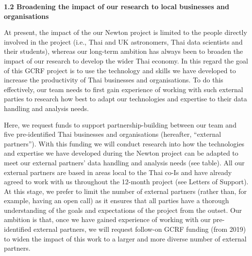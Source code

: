 \documentclass[11pt]{article}
\begin{document}
\vspace{3mm}
\noindent
{\large \bf 1.2 Broadening the impact of our research to local businesses and organisations}

\noindent
At present, the impact of the our Newton project is limited to the people directly involved in the project (i.e., Thai and UK astronomers, Thai data scientists and their students), whereas our long-term ambition has always been to broaden the impact of our research to develop the wider Thai economy. In this regard the goal of this GCRF project is to use the technology and skills we have developed to increase the productivity of Thai businesses and organisations. To do this effectively, our team needs to first gain experience of working with such external parties to research how best to adapt our technologies and expertise to their data handling and analysis needs.  

\vspace{2mm}
\noindent
Here, we request funds to support partnership-building between our team and five pre-identified Thai businesses and organisations (hereafter, ``external partners''). With this funding we will conduct research into how the technologies and expertise we have developed during the Newton project can be adapted to meet our external partners' data handling and analysis needs (see table). All our external partners are based in areas local to the Thai co-Is and have already agreed to work with us throughout the 12-month project (see Letters of Support). At this stage, we prefer to limit the number of external partners (rather than, for example, having an open call) as it ensures that all parties have a thorough understanding of the goals and expectations of the project from the outset. Our ambition is that, once we have gained experience of working with our pre-identified external partners, we will request follow-on GCRF funding (from 2019) to widen the impact of this work to a larger and more diverse number of external partners.
\end{document}
